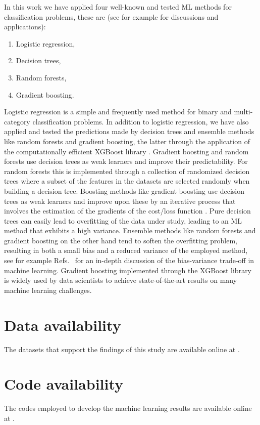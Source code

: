 \documentclass[superscriptaddress,unsortedaddress,
 amsmath,amssymb,
 aps,
]{revtex4-2}
\begin{document}
In this work we have applied four well-known and tested ML methods for classification problems, these are (see for example \cite{Hastie2009,Mehta2019} for discussions and applications):
\begin{enumerate}
    \item Logistic regression,
    \item Decision trees,
    \item Random forests,
    \item Gradient boosting.
\end{enumerate}
Logistic regression \cite{Hastie2009} is a simple and frequently used method for binary and multi-category classification problems. In addition to logistic regression, we have also applied and tested the predictions made by decision trees and ensemble methods like random forests and gradient boosting, the latter through the application of the computationally efficient XGBoost library \cite{xgboost2016}. Gradient boosting and random forests use decision trees as weak learners and improve their predictability. For random forests this is implemented through a collection of randomized decision trees where a  subset of the features in the datasets are selected randomly when building a decision tree. Boosting methods like gradient boosting use decision trees as  weak learners and improve upon these by an iterative process that involves the estimation of the gradients of the cost/loss function \cite{Hastie2009}. Pure decision trees can easily lead to overfitting of the data under study, leading to an ML method that exhibits a high variance. Ensemble methods like random forests and gradient boosting on the other hand tend to soften the overfitting problem, resulting in both a small bias and a reduced variance of the employed method, see for example Refs.~\cite{Hastie2009,Mehta2019} for an in-depth discussion of the bias-variance trade-off in machine learning. Gradient boosting implemented through the  XGBoost library \cite{xgboost2016} is widely used by data scientists to achieve state-of-the-art results on many machine learning challenges. 

\section*{Data availability} 
The datasets that support the findings of this study are available online at \cite{Ohebbi2021}.

\section*{Code availability} 
The codes employed to develop the machine learning results are available online at 
\cite{Ohebbi2021}.
\end{document}
